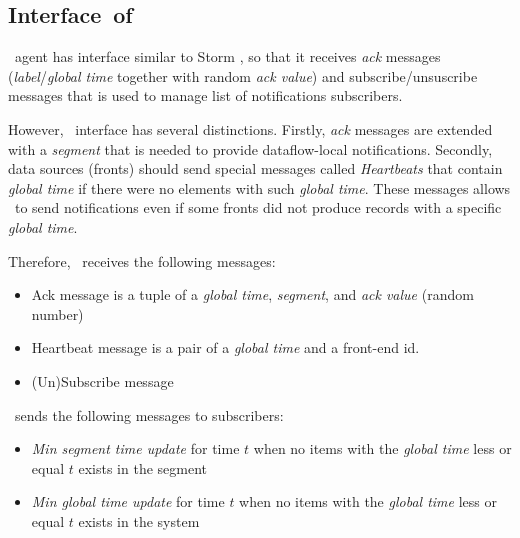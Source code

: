 \subsection{Interface\ of\ \tracker\ }
\tracker\ agent has interface similar to Storm \acker, so that it receives \textit{ack} messages (\textit{label}/\textit{global time} together with random \textit{ack value}) and subscribe/unsuscribe messages that is used to manage list of notifications subscribers. 

However, \tracker\  interface has several distinctions. Firstly, \textit{ack} messages are extended with a \textit{segment} that is needed to provide dataflow-local notifications. Secondly, data sources (fronts) should send special messages called \textit{Heartbeats} that contain \textit{global time} if there were no elements with such \textit{global time}. These messages allows \tracker\ to send notifications even if some fronts did not produce records with a specific \textit{global time}. 

Therefore, \tracker\ receives the following messages:
\begin{itemize}
    \item Ack message is a tuple of a \textit{global time}, \textit{segment}, and \textit{ack value} (random number)
    \item Heartbeat message is a pair of a \textit{global time} and a front-end id.
    \item (Un)Subscribe message
\end{itemize}


\tracker\ sends the following messages to subscribers:
\begin{itemize}
    \item \textit{Min segment time update} for time $t$ when no items with the \textit{global time} less or equal $t$ exists in the segment
    \item \textit{Min global time update} for time $t$ when no items with the \textit{global time} less or equal $t$ exists in the system
\end{itemize}


